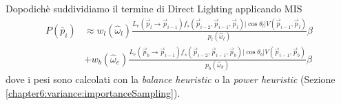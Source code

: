Dopodich\`e suddividiamo il termine di Direct Lighting applicando MIS
\begin{align}
	P(\bar{p}_i)&\approx w_l(\hat{\omega}_l)\frac{L_e(\vec{p}_l\to\vec{p}_{i-1})f_s(\vec{p}_{i-2},\vec{p}_{i-1},\vec{p}_l)
		|\cos\theta_l|V(\vec{p}_{i-1},\vec{p}_l)}{p_l(\hat{\omega}_l)}\beta \nonumber \\
	&+w_b(\hat{\omega}_e)\frac{L_e(\vec{p}_b\to\vec{p}_{i-1})f_s(\vec{p}_{i-2},\vec{p}_{i-1},\vec{p}_b)
		|\cos\theta_b|V(\vec{p}_{i-1},\vec{p}_b)}{p_b(\hat{\omega}_b)}\beta
\end{align}
dove i pesi sono calcolati con la \textit{balance heuristic} o la \textit{power heuristic} (Sezione \ref{chapter6:variance:importanceSampling}).\par
